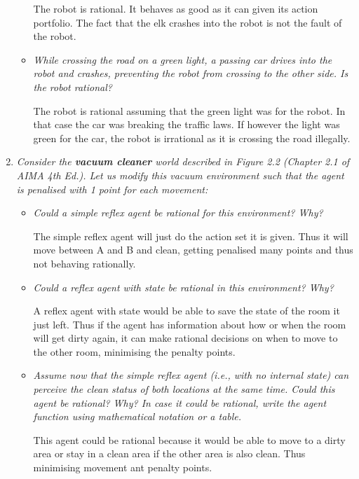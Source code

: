 \begin{enumerate}
\begin{itemize}
            The robot is rational. It behaves as good as it can given its action portfolio. The fact that the elk crashes into the robot is not the fault of the robot. 
            \item \textit{While crossing the road on a green light, a passing car drives into the robot and crashes, preventing the robot from crossing to the other side. Is the robot rational?} 

            The robot is rational assuming that the green light was for the robot. In that case the car was breaking the traffic laws. If however the light was green for the car, the robot is irrational as it is crossing the road illegally. 
        \end{itemize}

    \item \textit{Consider the \textbf{vacuum cleaner} world described in Figure 2.2 (Chapter 2.1 of AIMA 4th Ed.). Let us modify this vacuum environment such that the agent is penalised with 1 point for each movement:} 
        \begin{itemize}
            \item \textit{Could a simple reflex agent be rational for this environment? Why?}

            The simple reflex agent will just do the action set it is given. Thus it will move between A and B and clean, getting penalised many points and thus not behaving rationally. 
            
            \item \textit{Could a reflex agent with state be rational in this environment? Why?}

            A reflex agent with state would be able to save the state of the room it just left. Thus if the agent has information about how or when the room will get dirty again, it can make rational decisions on when to move to the other room, minimising the penalty points. 
            
            \item \textit{Assume now that the simple reflex agent (i.e., with no internal state) can perceive the clean status of both locations at the same time. Could this agent be rational? Why? In case it could be rational, write the agent function using mathematical notation or a table.}

            This agent could be rational because it would be able to move to a dirty area or stay in a clean area if the other area is also clean. Thus minimising movement ant penalty points. 


\end{itemize}
\end{enumerate}
